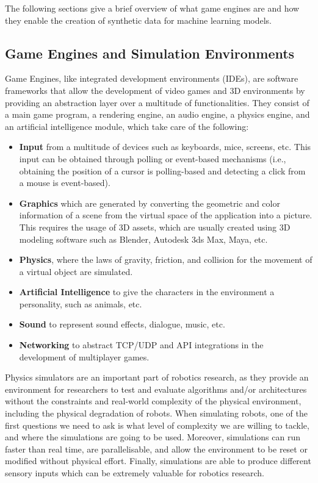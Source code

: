 The following sections give a brief overview of what game engines are and how they enable the creation of synthetic data for machine learning models.

\subsection{Game Engines and Simulation Environments}\label{chap2:gameengines}
Game Engines, like integrated development environments (IDEs), are software frameworks that allow the development of video games and 3D environments by providing an abstraction layer over a multitude of functionalities. They consist of a main game program, a rendering engine, an audio engine, a physics engine, and an artificial intelligence module, which take care of the following: 
\begin{itemize}
    \item \textbf{Input} from a multitude of devices such as keyboards, mice, screens, etc. This input can be obtained through polling or event-based mechanisms (i.e., obtaining the position of a cursor is polling-based and detecting a click from a mouse is event-based).
    \item \textbf{Graphics} which are generated by converting the geometric and color information of a scene from the virtual space of the application into a picture. This requires the usage of 3D assets, which are usually created using 3D modeling software such as Blender, Autodesk 3ds Max, Maya, etc. 
    \item \textbf{Physics}, where the laws of gravity, friction, and collision for the movement of a virtual object are simulated.
    \item \textbf{Artificial Intelligence} to give the characters in the environment a personality, such as animals, etc.
    \item \textbf{Sound} to represent sound effects, dialogue, music, etc. 
    \item \textbf{Networking} to abstract TCP/UDP and API integrations in the development of multiplayer games.
\end{itemize}

Physics simulators are an important part of robotics research, as they provide an environment for researchers to test and evaluate algorithms and/or architectures without the constraints and real-world complexity of the physical environment, including the physical degradation of robots. When simulating robots, one of the first questions we need to ask is what level of complexity we are willing to tackle, and where the simulations are going to be used. Moreover, simulations can run faster than real time, are parallelisable, and allow the environment to be reset or modified without physical effort. Finally, simulations are able to produce different sensory inputs which can be extremely valuable for robotics research.

